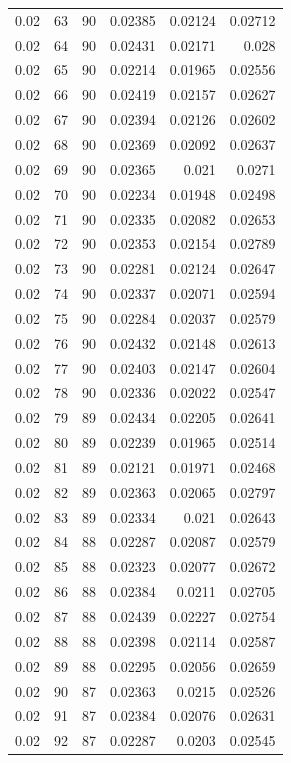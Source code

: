 \begin{tabular}{rrrrrr}
0.02 & 63 & 90 & 0.02385 & 0.02124 & 0.02712 \\
0.02 & 64 & 90 & 0.02431 & 0.02171 & 0.028 \\
0.02 & 65 & 90 & 0.02214 & 0.01965 & 0.02556 \\
0.02 & 66 & 90 & 0.02419 & 0.02157 & 0.02627 \\
0.02 & 67 & 90 & 0.02394 & 0.02126 & 0.02602 \\
0.02 & 68 & 90 & 0.02369 & 0.02092 & 0.02637 \\
0.02 & 69 & 90 & 0.02365 & 0.021 & 0.0271 \\
0.02 & 70 & 90 & 0.02234 & 0.01948 & 0.02498 \\
0.02 & 71 & 90 & 0.02335 & 0.02082 & 0.02653 \\
0.02 & 72 & 90 & 0.02353 & 0.02154 & 0.02789 \\
0.02 & 73 & 90 & 0.02281 & 0.02124 & 0.02647 \\
0.02 & 74 & 90 & 0.02337 & 0.02071 & 0.02594 \\
0.02 & 75 & 90 & 0.02284 & 0.02037 & 0.02579 \\
0.02 & 76 & 90 & 0.02432 & 0.02148 & 0.02613 \\
0.02 & 77 & 90 & 0.02403 & 0.02147 & 0.02604 \\
0.02 & 78 & 90 & 0.02336 & 0.02022 & 0.02547 \\
0.02 & 79 & 89 & 0.02434 & 0.02205 & 0.02641 \\
0.02 & 80 & 89 & 0.02239 & 0.01965 & 0.02514 \\
0.02 & 81 & 89 & 0.02121 & 0.01971 & 0.02468 \\
0.02 & 82 & 89 & 0.02363 & 0.02065 & 0.02797 \\
0.02 & 83 & 89 & 0.02334 & 0.021 & 0.02643 \\
0.02 & 84 & 88 & 0.02287 & 0.02087 & 0.02579 \\
0.02 & 85 & 88 & 0.02323 & 0.02077 & 0.02672 \\
0.02 & 86 & 88 & 0.02384 & 0.0211 & 0.02705 \\
0.02 & 87 & 88 & 0.02439 & 0.02227 & 0.02754 \\
0.02 & 88 & 88 & 0.02398 & 0.02114 & 0.02587 \\
0.02 & 89 & 88 & 0.02295 & 0.02056 & 0.02659 \\
0.02 & 90 & 87 & 0.02363 & 0.0215 & 0.02526 \\
0.02 & 91 & 87 & 0.02384 & 0.02076 & 0.02631 \\
0.02 & 92 & 87 & 0.02287 & 0.0203 & 0.02545 \\

\end{tabular}
